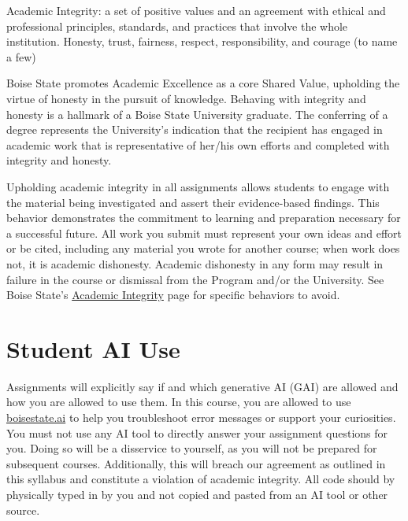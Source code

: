 \documentclass[
  12pt,
]{scrreprt}
\begin{document}
Academic Integrity: a set of positive values and an agreement with
ethical and professional principles, standards, and practices that
involve the whole institution. Honesty, trust, fairness, respect,
responsibility, and courage (to name a few)

Boise State promotes Academic Excellence as a core Shared Value,
upholding the virtue of honesty in the pursuit of knowledge. Behaving
with integrity and honesty is a hallmark of a Boise State University
graduate. The conferring of a degree represents the University's
indication that the recipient has engaged in academic work that is
representative of her/his own efforts and completed with integrity and
honesty.

Upholding academic integrity in all assignments allows students to
engage with the material being investigated and assert their
evidence-based findings. This behavior demonstrates the commitment to
learning and preparation necessary for a successful future. All work you
submit must represent your own ideas and effort or be cited, including
any material you wrote for another course; when work does not, it is
academic dishonesty. Academic dishonesty in any form may result in
failure in the course or dismissal from the Program and/or the
University. See Boise State's
\href{https://www.boisestate.edu/registrar/general-information-and-policies/academic-integrity/}{Academic
Integrity} page for specific behaviors to avoid.

\section{Student AI Use}\label{student-ai-use}

Assignments will explicitly say if and which generative AI (GAI) are
allowed and how you are allowed to use them. In this course, you are
allowed to use \href{https://boisestate.ai}{boisestate.ai} to help you
troubleshoot error messages or support your curiosities. You must not
use any AI tool to directly answer your assignment questions for you.
Doing so will be a disservice to yourself, as you will not be prepared
for subsequent courses. Additionally, this will breach our agreement as
outlined in this syllabus and constitute a violation of academic
integrity. All code should by physically typed in by you and not copied
and pasted from an AI tool or other source.
\end{document}
